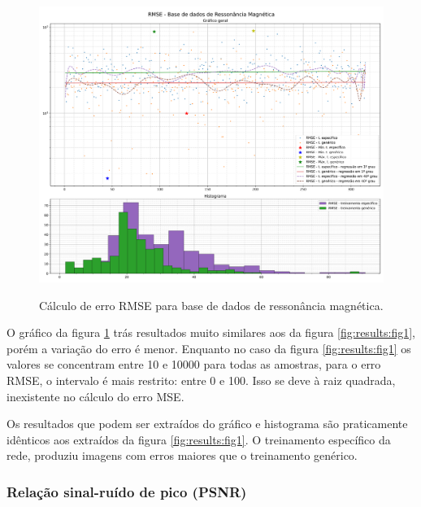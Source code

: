 \begin{figure}[H]
    \centering
    \caption{Cálculo de erro RMSE para base de dados de ressonância magnética.}
    \includegraphics[width=16cm]{fig/resultados/mri/png/rmse_mri_compound.png}
    \label{fig:results:fig2}
\end{figure}

O gráfico da figura \ref{fig:results:fig2} trás resultados muito similares aos da figura \ref{fig:results:fig1}, porém a variação do erro é menor. Enquanto no caso da figura \ref{fig:results:fig1} os valores se concentram entre 10 e 10000 para todas as amostras, para o erro RMSE, o intervalo é mais restrito: entre 0 e 100. Isso se deve à raiz quadrada, inexistente no cálculo do erro MSE.

Os resultados que podem ser extraídos do gráfico e histograma são praticamente idênticos aos extraídos da figura \ref{fig:results:fig1}. O treinamento específico da rede, produziu imagens com erros maiores que o treinamento genérico. 

\subsubsection{Relação sinal-ruído de pico (PSNR)}
\label{sec:result:mri:psnr}

